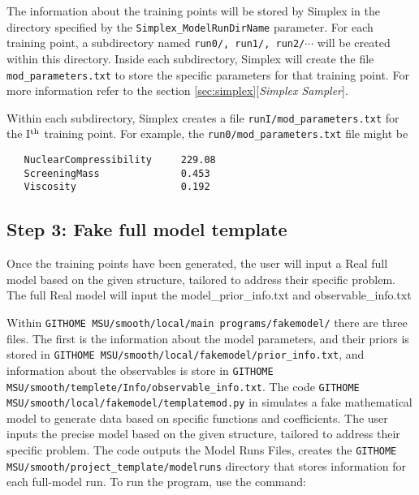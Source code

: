 \documentclass[UserManual.tex]{subfiles}
\begin{document}
The information about the training points will be stored by Simplex in the directory specified by the {\tt Simplex\_ModelRunDirName} parameter. For each training point, a subdirectory named {\tt run0/, run1/, run2/}$\cdots$ will be created within this directory. Inside each subdirectory, Simplex will create the file {\tt mod\_parameters.txt} to store the specific parameters for that training point. For more information refer to the section \ref{sec:simplex}[{\it Simplex Sampler}].

Within each subdirectory, Simplex creates a file {\tt runI/mod\_parameters.txt} for the I$^{\rm th}$ training point. For example, the {\tt run0/mod\_parameters.txt} file might be
{\tt\begin{verbatim}
   NuclearCompressibility     229.08
   ScreeningMass              0.453
   Viscosity                  0.192
\end{verbatim}
}


\subsection{Step 3: Fake full model template}
Once the training points have been generated, the user will input a Real full model based on the given structure, tailored to address their specific problem. The full Real model will input the model\_prior\_info.txt and observable\_info.txt

Within {\tt GITHOME MSU/smooth/local/main programs/fakemodel/} there are three files. The first is the information about the model parameters, and their priors is stored in {\tt GITHOME MSU/smooth/local/fakemodel/prior\_info.txt}, and information about the observables is store in {\tt GITHOME MSU/smooth/templete/Info/observable\_info.txt}. The code
{\tt GITHOME MSU/smooth/local/fakemodel/templatemod.py} in simulates a fake mathematical model to generate data based on specific functions and coefficients. The user inputs the precise model based on the given structure, tailored to address their specific problem. The code outputs the Model Runs Files, creates the {\tt GITHOME MSU/smooth/project\_template/modelruns} directory that stores information for each full-model run.
To run the program, use the command:
\end{document}
